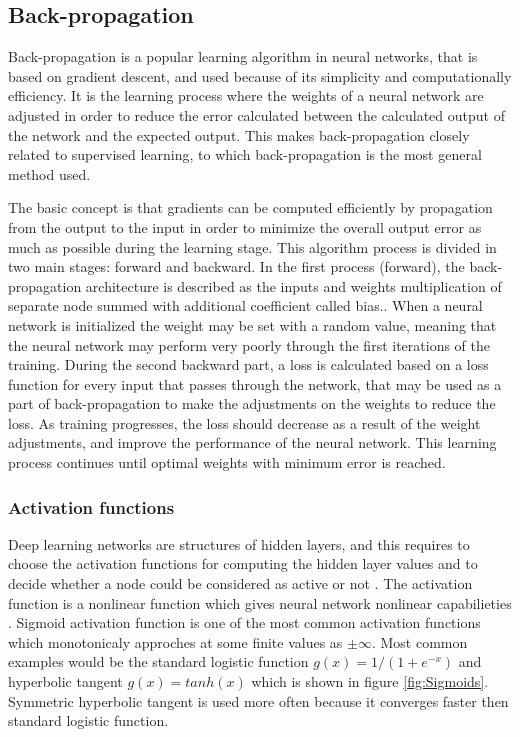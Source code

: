   
\subsection{Back-propagation}
Back-propagation is a popular learning algorithm in neural networks, that is based on gradient descent, and used because of its simplicity and computationally efficiency.\citep{Bengio2012, Duda2000} It is the learning process where the weights of a neural network are adjusted in order to reduce the error calculated between the calculated output of the network and the expected output. This makes back-propagation closely related to supervised learning, to which back-propagation is the most general method used.\citep{Duda2000}  

\noindent
The basic concept is that gradients can be computed efficiently by propagation from the output to the input in order to minimize the overall output error as much as possible during the learning stage. This algorithm process is divided in two main stages: forward and backward. In the first process (forward), the back-propagation architecture is described as the inputs and weights multiplication of separate node summed with additional coefficient called bias.\citep{Hameed2016,LeCun1998}. When a neural network is initialized the weight may be set with a random value, meaning that the neural network may perform very poorly through the first iterations of the training.
During the second backward part, a loss is calculated based on a loss function for every input that passes through the network, that may be used as a part of back-propagation to make the adjustments on the weights to reduce the loss. As training progresses, the loss should decrease as a result of the weight adjustments, and improve the performance of the neural network.\citep{LeCun2015, Goodfellow2016, Duda2000}   
This learning process continues until optimal weights with minimum error is reached.\citep{Hameed2016}
\noindent

\subsubsection{Activation functions}
Deep learning networks are structures of hidden layers, and this requires to choose the activation functions for computing the hidden layer values and to decide whether a node could be considered as active or not \citep{Goodfellow2016}. The activation function is a nonlinear function which gives neural network nonlinear capabilieties \citep{Bengio2012}.\newline
\noindent
Sigmoid activation function is one of the most common activation functions which monotonicaly approches at some finite values as $\pm\infty$. Most common examples would be the standard logistic function $g(x) = 1/(1 + e^{-x})$ and hyperbolic tangent $g(x) = tanh(x)$  which is shown in figure \ref{fig:Sigmoids}. Symmetric hyperbolic tangent is used more often because it converges faster then standard logistic function.\citep{Bengio2012}

